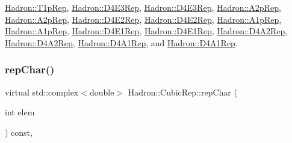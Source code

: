 \mbox{\hyperlink{structHadron_1_1T1pRep_ad5fd4bf6eaa8fd1a465bd6757d7b4379}{Hadron\+::\+T1p\+Rep}}, \mbox{\hyperlink{structHadron_1_1D4E3Rep_afd42741649d0a7906d6232710f1522aa}{Hadron\+::\+D4\+E3\+Rep}}, \mbox{\hyperlink{structHadron_1_1D4E3Rep_afd42741649d0a7906d6232710f1522aa}{Hadron\+::\+D4\+E3\+Rep}}, \mbox{\hyperlink{structHadron_1_1A2pRep_a7e7d7668295318bf08c6ab79ce2208e6}{Hadron\+::\+A2p\+Rep}}, \mbox{\hyperlink{structHadron_1_1A2pRep_a7e7d7668295318bf08c6ab79ce2208e6}{Hadron\+::\+A2p\+Rep}}, \mbox{\hyperlink{structHadron_1_1D4E2Rep_a5f1abc30578bd5d20e32ca5676a86c84}{Hadron\+::\+D4\+E2\+Rep}}, \mbox{\hyperlink{structHadron_1_1D4E2Rep_a5f1abc30578bd5d20e32ca5676a86c84}{Hadron\+::\+D4\+E2\+Rep}}, \mbox{\hyperlink{structHadron_1_1A1pRep_a9f59a2c62dd82462ab66f5a990939898}{Hadron\+::\+A1p\+Rep}}, \mbox{\hyperlink{structHadron_1_1A1pRep_a9f59a2c62dd82462ab66f5a990939898}{Hadron\+::\+A1p\+Rep}}, \mbox{\hyperlink{structHadron_1_1D4E1Rep_a5c4eb87d8e59c8653c6d4da163c300ea}{Hadron\+::\+D4\+E1\+Rep}}, \mbox{\hyperlink{structHadron_1_1D4E1Rep_a5c4eb87d8e59c8653c6d4da163c300ea}{Hadron\+::\+D4\+E1\+Rep}}, \mbox{\hyperlink{structHadron_1_1D4A2Rep_ac408f55785ba08ce215277bb1cb4a006}{Hadron\+::\+D4\+A2\+Rep}}, \mbox{\hyperlink{structHadron_1_1D4A2Rep_ac408f55785ba08ce215277bb1cb4a006}{Hadron\+::\+D4\+A2\+Rep}}, \mbox{\hyperlink{structHadron_1_1D4A1Rep_a45938f0cd557c639eedba39b63fabe29}{Hadron\+::\+D4\+A1\+Rep}}, and \mbox{\hyperlink{structHadron_1_1D4A1Rep_a45938f0cd557c639eedba39b63fabe29}{Hadron\+::\+D4\+A1\+Rep}}.

\mbox{\label{structHadron_1_1CubicRep_af45227106e8e715e84b0af69cd3b36f8}} 
\subsubsection{\texorpdfstring{repChar()}{repChar()}\hspace{0.1cm}{\footnotesize\ttfamily [2/2]}}
{\footnotesize\ttfamily virtual std\+::complex$<$double$>$ Hadron\+::\+Cubic\+Rep\+::rep\+Char (\begin{DoxyParamCaption}\item[{int}]{elem }\end{DoxyParamCaption}) const\hspace{0.3cm}{\ttfamily [inline]}, {\ttfamily [virtual]}}



